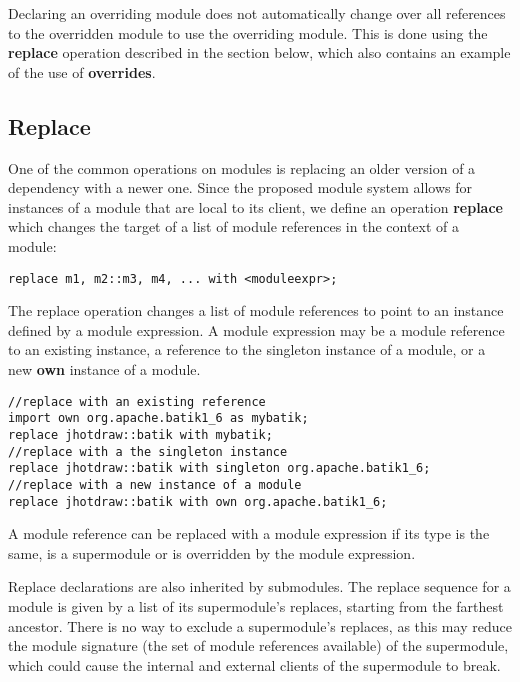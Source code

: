 Declaring an overriding module does not automatically change over all references
to the overridden module to use the overriding module. This is done using the
\textbf{replace} operation described in the section below, which also contains
an example of the use of \textbf{overrides}.

\subsection{Replace}

One of the common operations on modules is replacing an older version of a
dependency with a newer one. Since the proposed module system allows for instances
of a module that are local to its client, we define an operation \textbf{replace} which
changes the target of a list of module references in the context of a module:

\begin{lstlisting}
replace m1, m2::m3, m4, ... with <moduleexpr>;
\end{lstlisting}

The replace operation changes a list of module references to point to an instance
defined by a module expression. A module expression may be a module reference to
an existing instance, a reference to the singleton instance of a module, or
a new \textbf{own} instance of a module.

\begin{lstlisting}[caption=Module Expressions for Replace]
//replace with an existing reference
import own org.apache.batik1_6 as mybatik;
replace jhotdraw::batik with mybatik;
//replace with a the singleton instance
replace jhotdraw::batik with singleton org.apache.batik1_6;
//replace with a new instance of a module
replace jhotdraw::batik with own org.apache.batik1_6;
\end{lstlisting}

A module reference can be replaced with a module expression if its type
is the same, is a supermodule or is overridden by the module expression.

Replace declarations are also inherited by submodules. The replace sequence for a
module is given by a list of its supermodule's replaces, starting from the farthest
ancestor. There is no way to exclude a supermodule's replaces, as
this may reduce the module signature (the set of module references available) of
the supermodule, which could cause the internal and external clients of
the supermodule to break.

